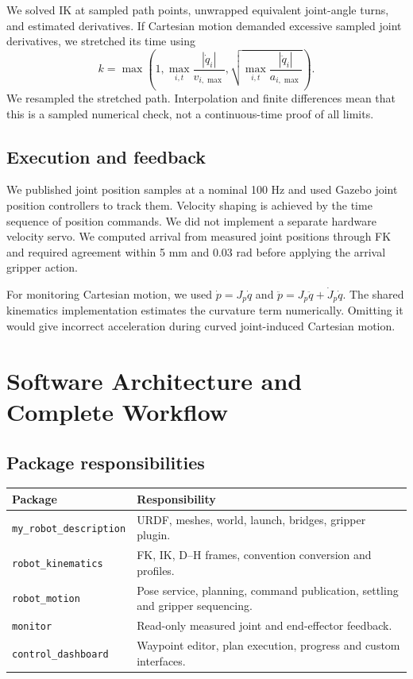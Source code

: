 \documentclass[11pt,a4paper]{report}
\begin{document}
We solved IK at sampled path points, unwrapped equivalent joint-angle turns, and estimated derivatives. If Cartesian motion demanded excessive sampled joint derivatives, we stretched its time using
\begin{equation}k=\max\left(1,\max_{i,t}\frac{|\dot q_i|}{v_{i,\max}},\sqrt{\max_{i,t}\frac{|\ddot q_i|}{a_{i,\max}}}\right).\end{equation}
We resampled the stretched path. Interpolation and finite differences mean that this is a sampled numerical check, not a continuous-time proof of all limits.
\section{Execution and feedback}
We published joint position samples at a nominal 100 Hz and used Gazebo joint position controllers to track them. Velocity shaping is achieved by the time sequence of position commands. We did not implement a separate hardware velocity servo. We computed arrival from measured joint positions through FK and required agreement within 5 mm and 0.03 rad before applying the arrival gripper action.

For monitoring Cartesian motion, we used $\dot p=J_p\dot q$ and $\ddot p=J_p\ddot q+\dot J_p\dot q$. The shared kinematics implementation estimates the curvature term numerically. Omitting it would give incorrect acceleration during curved joint-induced Cartesian motion.
\chapter{Software Architecture and Complete Workflow}
\section{Package responsibilities}
\begin{longtable}{p{.30\linewidth}p{.61\linewidth}}\toprule
Package & Responsibility\\\midrule
\texttt{my\_robot\_description}&URDF, meshes, world, launch, bridges, gripper plugin.\\
\texttt{robot\_kinematics}&FK, IK, D--H frames, convention conversion and profiles.\\
\texttt{robot\_motion}&Pose service, planning, command publication, settling and gripper sequencing.\\
\texttt{monitor}&Read-only measured joint and end-effector feedback.\\
\texttt{control\_dashboard}&Waypoint editor, plan execution, progress and custom interfaces.\\\bottomrule
\end{longtable}
\end{document}

